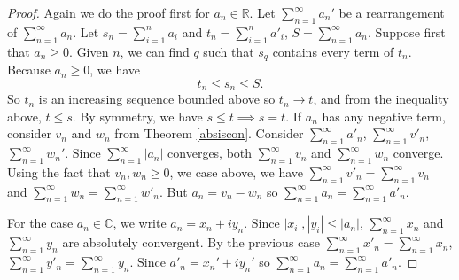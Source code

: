 \begin{proof}
    Again we do the proof first for \(a_n \in \mathbb{R}\). Let \(\sum\limits_{n=1}^{\infty} a_n'\) be a rearrangement of \(\sum\limits_{n=1}^{\infty} a_n\). Let \(s_n = \sum\limits_{i=1}^{n} a_i\) and \(t_n = \sum\limits_{i=1}^{n} a'_i\), \(S = \sum\limits_{n=1}^{\infty} a_n\). Suppose first that \(a_n \geq 0\). Given \(n\), we can find \(q\) such that \(s_q\) contains every term of \(t_n\). Because \(a_n \geq 0\), we have
    \[
        t_n \leq s_n \leq S.
    \]
    So \(t_n\) is an increasing sequence bounded above so \(t_n \to t\), and from the inequality above, \(t \leq s\). By symmetry, we have \(s \leq t \implies s = t\).
    If \(a_n\) has any negative term, consider \(v_n\) and \(w_n\) from Theorem \eqref{absiscon}. Consider \(\sum\limits_{n=1}^{\infty} a'_n\), \(\sum\limits_{n=1}^{\infty} v'_n\), \(\sum\limits_{n=1}^{\infty} w_n'\). Since \(\sum\limits_{n=1}^{\infty} \left\vert a_n \right\vert\) converges, both \(\sum\limits_{n=1}^{\infty} v_n\) and \(\sum\limits_{n=1}^{\infty} w_n\) converge. Using the fact that \(v_n, w_n \geq 0\), we case above, we have \(\sum\limits_{n=1}^{\infty} v'_n = \sum\limits_{n=1}^{\infty} v_n\) and \(\sum\limits_{n=1}^{\infty} w_n = \sum\limits_{n=1}^{\infty} w'_n\). But \(a_n = v_n - w_n\) so \(\sum\limits_{n=1}^{\infty} a_n = \sum\limits_{n=1}^{\infty} a'_n\).

    For the case \(a_n \in \mathbb{C}\), we write \(a_n = x_n + iy_n\). Since \(\left\vert x_i \right\vert, \left\vert y_i \right\vert \leq \left\vert a_n \right\vert \), \(\sum\limits_{n=1}^{\infty} x_n\) and \(\sum\limits_{n=1}^{\infty} y_n\) are absolutely convergent. By the previous case \(\sum\limits_{n=1}^{\infty} x'_n = \sum\limits_{n=1}^{\infty} x_n\),\(\sum\limits_{n=1}^{\infty} y'_n = \sum\limits_{n=1}^{\infty} y_n\). Since \(a'_n = x_n' + iy_n'\) so \(\sum\limits_{n=1}^{\infty} a_n = \sum\limits_{n=1}^{\infty} a'_n\).
\end{proof}